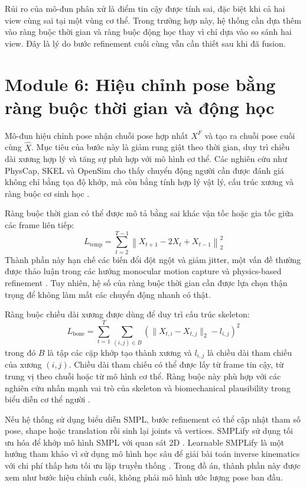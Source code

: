 \documentclass[../DoAn.tex]{subfiles}
\begin{document}
Rủi ro của mô-đun phân xử là điểm tin cậy được tính sai, đặc biệt khi cả hai view cùng sai tại một vùng cơ thể. Trong trường hợp này, hệ thống cần dựa thêm vào ràng buộc thời gian và ràng buộc động học thay vì chỉ dựa vào so sánh hai view. Đây là lý do bước refinement cuối cùng vẫn cần thiết sau khi đã fusion.

\section{Module 6: Hiệu chỉnh pose bằng ràng buộc thời gian và động học}
\label{sec:pose_refinement}

Mô-đun hiệu chỉnh pose nhận chuỗi pose hợp nhất $X^F$ và tạo ra chuỗi pose cuối cùng $\hat{X}$. Mục tiêu của bước này là giảm rung giật theo thời gian, duy trì chiều dài xương hợp lý và tăng sự phù hợp với mô hình cơ thể. Các nghiên cứu như PhysCap, SKEL và OpenSim cho thấy chuyển động người cần được đánh giá không chỉ bằng tọa độ khớp, mà còn bằng tính hợp lý vật lý, cấu trúc xương và ràng buộc cơ sinh học \cite{physcap2020,keller2023skin,delp2007opensim}.

Ràng buộc thời gian có thể được mô tả bằng sai khác vận tốc hoặc gia tốc giữa các frame liên tiếp:
\[
L_{\text{temp}} =
\sum_{t=2}^{T-1}
\left\|
X_{t+1} - 2X_t + X_{t-1}
\right\|_2^2
\]
Thành phần này hạn chế các biến đổi đột ngột và giảm jitter, một vấn đề thường được thảo luận trong các hướng monocular motion capture và physics-based refinement \cite{shin2024wham,physcap2020}. Tuy nhiên, hệ số của ràng buộc thời gian cần được lựa chọn thận trọng để không làm mất các chuyển động nhanh có thật.

Ràng buộc chiều dài xương được dùng để duy trì cấu trúc skeleton:
\[
L_{\text{bone}} =
\sum_{t=1}^{T}
\sum_{(i,j)\in B}
\left(
\|X_{t,i}-X_{t,j}\|_2 - l_{i,j}
\right)^2
\]
trong đó $B$ là tập các cặp khớp tạo thành xương và $l_{i,j}$ là chiều dài tham chiếu của xương $(i,j)$. Chiều dài tham chiếu có thể được lấy từ frame tin cậy, từ trung vị theo chuỗi hoặc từ mô hình cơ thể. Ràng buộc này phù hợp với các nghiên cứu nhấn mạnh vai trò của skeleton và biomechanical plausibility trong biểu diễn cơ thể người \cite{keller2023skin,delp2007opensim}.

Nếu hệ thống sử dụng biểu diễn SMPL, bước refinement có thể cập nhật tham số pose, shape hoặc translation rồi sinh lại joints và vertices. SMPLify sử dụng tối ưu hóa để khớp mô hình SMPL với quan sát 2D \cite{smplify2016}. Learnable SMPLify là một hướng tham khảo vì sử dụng mô hình học sâu để giải bài toán inverse kinematics với chi phí thấp hơn tối ưu lặp truyền thống \cite{yang2025learnable}. Trong đồ án, thành phần này được xem như bước hiệu chỉnh cuối, không phải mô hình ước lượng pose ban đầu.
\end{document}
